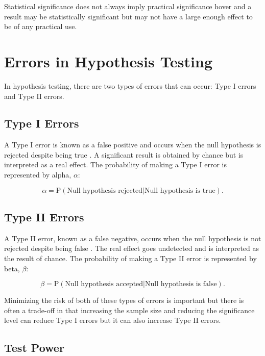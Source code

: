\documentclass[
]{book}
\begin{document}
Statistical significance does not always imply practical significance hover and a result may be statistically significant but may not have a large enough effect to be of any practical use.

\hypertarget{errors-in-hypothesis-testing}{%
\section{Errors in Hypothesis Testing}\label{errors-in-hypothesis-testing}}

In hypothesis testing, there are two types of errors that can occur: Type I errors and Type II errors.

\hypertarget{type-i-errors}{%
\subsection{Type I Errors}\label{type-i-errors}}

A Type I error is known as a false positive and occurs when the null hypothesis is rejected despite being true \citep{banerjee}. A significant result is obtained by chance but is interpreted as a real effect. The probability of making a Type I error is represented by alpha, \(\alpha\):

\[\alpha= \textrm{P}(\textrm{Null hypothesis rejected} | \textrm{Null hypothesis is true}).\]

\hypertarget{type-ii-errors}{%
\subsection{Type II Errors}\label{type-ii-errors}}

A Type II error, known as a false negative, occurs when the null hypothesis is not rejected despite being false \citep{banerjee}. The real effect goes undetected and is interpreted as the result of chance. The probability of making a Type II error is represented by beta, \(\beta\):

\[\beta= \textrm{P} (\textrm{Null hypothesis accepted} | \textrm{Null hypothesis is false}).\]

Minimizing the risk of both of these types of errors is important but there is often a trade-off in that increasing the sample size and reducing the significance level can reduce Type I errors but it can also increase Type II errors.

\hypertarget{test-power}{%
\subsection{Test Power}\label{test-power}}
\end{document}
